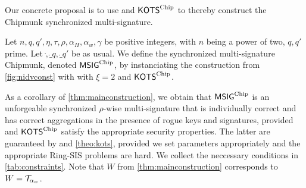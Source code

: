 Our concrete proposal is to use \eprint{$\hvcencoded$}\cameraready{$\hvccamera$} and $\mathsf{KOTS}^{\textup{Chip}}$ to thereby construct the Chipmunk synchronized multi-signature.
\begin{definition}\label{def:actual_chipmunk}
Let $n, q, q', \eta, \tau, \rho, \alpha_H, \alpha_w, \gamma$ be positive integers, with $n$ being a power of two, $q, q'$ prime.
Let $\ring, \ring_q, \ring_{q'}$ be as usual. We define the synchronized multi-signature Chipmunk, denoted $\mathsf{MSIG}^{\textup{Chip}}$, by instanciating the construction from \autoref{fig:nidvconst} with \eprint{$\hvcencoded$}\cameraready{$\hvccamera$} with $\xi=2$ and $\mathsf{KOTS}^{\textup{Chip}}$.
\end{definition}
As a corollary of \autoref{thm:mainconstruction}, we obtain that $\mathsf{MSIG}^{\textup{Chip}}$ is an unforgeable synchronized $\rho$-wise multi-signature that is individually correct and has correct aggregations in the presence of rogue keys and signatures,
provided \eprint{$\hvcencoded$}\cameraready{$\hvccamera$} and $\mathsf{KOTS}^{\textup{Chip}}$ satisfy the appropriate security properties. The latter are guaranteed by  and \autoref{theo:kots}, provided we set parameters appropriately and the appropriate Ring-SIS problems are hard.
We collect the neccessary conditions in \autoref{tab:constraints}. Note that $W$ from \autoref{thm:mainconstruction} corresponds to $W = \mathcal{T}_{\alpha_w}$.


